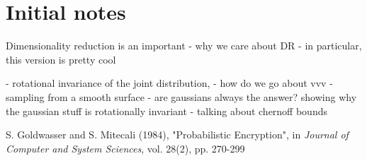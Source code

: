 \documentclass[11pt]{article}
\newcommand{\ir}[1]{\textnormal{\sc#1}}
\begin{document}
\section{Initial notes}

Dimensionality reduction is an important 
- why we care about DR
- in particular, this version is pretty cool

- rotational invariance of the joint distribution, 
- how do we go about vvv 
- sampling from a smooth surface
- are gaussians always the answer?
showing why the gaussian stuff is rotationally invariant
- talking about chernoff bounds

\begin{thebibliography}{1}
     \ir{S. Goldwasser and S. Mitecali} (1984), "Probabilistic Encryption", in \textit{Journal of Computer and System Sciences}, vol. 28(2), pp. 270-299
        
\end{thebibliography}
\end{document}
